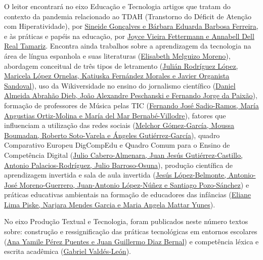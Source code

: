 \documentclass{textolivre-html}
\begin{document}
O leitor encontrará no eixo Educação e Tecnologia artigos que tratam do contexto da pandemia relacionado ao TDAH (Transtorno do Déficit de Atenção com Hiperatividade), por \href{https://doi.org/10.35699/1983-3652.2021.25043}{Sineide Gonçalves e Bárbara Eduarda Barbosa Ferreira}, e às práticas e papéis na educação, por \href{https://doi.org/10.35699/1983-3652.2021.24941}{Joyce Vieira Fettermann e Annabell Dell Real Tamariz}. Encontra ainda trabalhos sobre a aprendizagem da tecnologia na área de língua espanhola e suas literaturas (\href{https://doi.org/10.35699/1983-3652.2021.26394}{Elisabeth Melguizo Moreno}), abordagem conceitual de três tipos de letramento (\href{https://doi.org/10.35699/1983-3652.2021.29513}{Julián Rodríguez López, Maricela López Ornelas, Katiuska Fernández Morales e Javier Organista Sandoval}), uso da Wikiversidade no ensino do jornalismo científico (\href{https://doi.org/10.35699/1983-3652.2021.24935}{Daniel Almeida Abrahão Dieb, João Alexandre Peschanski e Fernando Jorge da Paixão}), formação de professores de Música pelas TIC (\href{https://doi.org/10.35699/1983-3652.2021.25419}{Fernando José Sadio-Ramos, María Angustias Ortiz-Molina e María del Mar Bernabé-Villodre}), fatores que influenciam a utilização das redes sociais (\href{https://doi.org/10.35699/1983-3652.2021.25420}{Melchor Gómez-García, Moussa Boumadan, Roberto Soto-Varela e Ángeles Gutiérrez-García}), quadro Comparativo Europeu DigCompEdu e Quadro Comum para o Ensino de Competência Digital (\href{https://doi.org/10.35699/1983-3652.2021.25740}{Julio Cabero-Almenara, Juan Jesús Gutiérrez-Castillo, Antonio Palacios-Rodríguez, Julio Barroso-Osuna}), produção científica de aprendizagem invertida e sala de aula invertida (\href{https://doi.org/10.35699/1983-3652.2021.26266}{Jesús López-Belmonte, Antonio-José Moreno-Guerrero, Juan-Antonio López-Núñez e Santiago Pozo-Sánchez}) e práticas educativas ambientais na formação de educadores das infâncias (\href{	https://doi.org/10.35699/1983-3652.2021.25698}{Eliane Lima Piske, Narjara Mendes Garcia e Maria Angela Mattar Yunes}).

No eixo Produção Textual e Tecnologia, foram publicados neste número textos sobre: construção e ressignificação das práticas tecnológicas em entornos escolares (\href{https://doi.org/10.35699/1983-3652.2021.29523}{Ana Yamile Pérez Puentes e Juan Guillermo Diaz Bernal}) e competência léxica e escrita acadêmica (\href{https://doi.org/10.35699/1983-3652.2021.24560}{Gabriel Valdés-León}).
\end{document}
